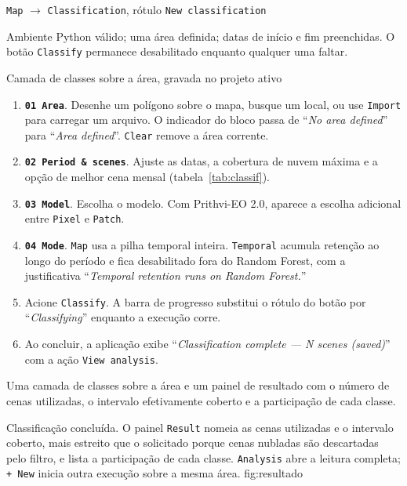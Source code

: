 \documentclass[12pt,a4paper]{article}
\newcommand{\msg}[1]{``\textit{#1}''}
\begin{document}
\begin{ficha}
  \item[Painel] \texttt{Map} $\rightarrow$ \texttt{Classification}, r\'otulo
        \texttt{New classification}
  \item[Pr\'e-condi\c{c}\~oes] Ambiente Python v\'alido; uma \'area definida;
        datas de in\'icio e fim preenchidas. O bot\~ao \texttt{Classify}
        permanece desabilitado enquanto qualquer uma faltar.
  \item[Sa\'ida] Camada de classes sobre a \'area, gravada no projeto ativo
\end{ficha}


\begin{enumerate}[leftmargin=*,itemsep=.3em]
  \item \textbf{\texttt{01 Area}}. Desenhe um pol\'igono sobre o mapa, busque
        um local, ou use \texttt{Import} para carregar um arquivo. O indicador
        do bloco passa de \msg{No area defined} para \msg{Area defined}.
        \texttt{Clear} remove a \'area corrente.
  \item \textbf{\texttt{02 Period \& scenes}}. Ajuste as datas, a cobertura de
        nuvem m\'axima e a op\c{c}\~ao de melhor cena mensal
        (tabela~\ref{tab:classif}).
  \item \textbf{\texttt{03 Model}}. Escolha o modelo. Com Prithvi-EO 2.0,
        aparece a escolha adicional entre \texttt{Pixel} e \texttt{Patch}.
  \item \textbf{\texttt{04 Mode}}. \texttt{Map} usa a pilha temporal inteira.
        \texttt{Temporal} acumula reten\c{c}\~ao ao longo do per\'iodo e fica
        desabilitado fora do Random Forest, com a justificativa
        \msg{Temporal retention runs on Random Forest.}
  \item Acione \texttt{Classify}. A barra de progresso substitui o r\'otulo do
        bot\~ao por \msg{Classifying} enquanto a execu\c{c}\~ao corre.
  \item Ao concluir, a aplica\c{c}\~ao exibe \msg{Classification complete ---
        N scenes (saved)} com a a\c{c}\~ao \texttt{View analysis}.
\end{enumerate}

 Uma camada de classes sobre a \'area e um painel de
resultado com o n\'umero de cenas utilizadas, o intervalo efetivamente coberto
e a participa\c{c}\~ao de cada classe.

  {Classifica\c{c}\~ao conclu\'ida. O painel \texttt{Result} nomeia as cenas
   utilizadas e o intervalo coberto, mais estreito que o solicitado porque
   cenas nubladas s\~ao descartadas pelo filtro, e lista a participa\c{c}\~ao
   de cada classe. \texttt{Analysis} abre a leitura completa; \texttt{+ New}
   inicia outra execu\c{c}\~ao sobre a mesma \'area.}
  {fig:resultado}
\end{document}
